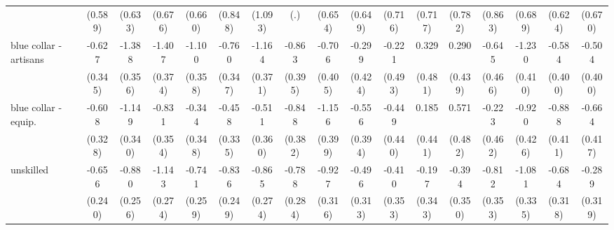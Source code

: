 {\begin{tabular}{l*{16}{c}}
                    &     (0.589)         &     (0.633)         &     (0.676)         &     (0.660)         &     (0.848)         &     (1.093)         &         (.)         &     (0.654)         &     (0.649)         &     (0.716)         &     (0.717)         &     (0.782)         &     (0.863)         &     (0.689)         &     (0.624)         &     (0.670)         \\
[1em]
blue collar - artisans&      -0.627         &      -1.388\sym{***}&      -1.407\sym{***}&      -1.100\sym{**} &      -0.760\sym{*}  &      -1.164\sym{**} &      -0.863\sym{*}  &      -0.706         &      -0.299         &      -0.221         &       0.329         &       0.290         &      -0.645         &      -1.230\sym{**} &      -0.584         &      -0.504         \\
                    &     (0.345)         &     (0.356)         &     (0.374)         &     (0.358)         &     (0.347)         &     (0.371)         &     (0.395)         &     (0.405)         &     (0.424)         &     (0.493)         &     (0.481)         &     (0.439)         &     (0.466)         &     (0.410)         &     (0.400)         &     (0.400)         \\
[1em]
blue collar - equip.&      -0.608         &      -1.149\sym{***}&      -0.831\sym{*}  &      -0.344         &      -0.458         &      -0.511         &      -0.848\sym{*}  &      -1.156\sym{**} &      -0.556         &      -0.449         &       0.185         &       0.571         &      -0.223         &      -0.920\sym{*}  &      -0.888\sym{*}  &      -0.664         \\
                    &     (0.328)         &     (0.340)         &     (0.354)         &     (0.348)         &     (0.335)         &     (0.360)         &     (0.382)         &     (0.399)         &     (0.394)         &     (0.440)         &     (0.441)         &     (0.482)         &     (0.462)         &     (0.426)         &     (0.411)         &     (0.417)         \\
[1em]
unskilled           &      -0.656\sym{**} &      -0.880\sym{***}&      -1.143\sym{***}&      -0.741\sym{**} &      -0.836\sym{***}&      -0.865\sym{**} &      -0.788\sym{**} &      -0.927\sym{**} &      -0.496         &      -0.410         &      -0.197         &      -0.394         &      -0.812\sym{*}  &      -1.081\sym{**} &      -0.684\sym{*}  &      -0.289         \\
                    &     (0.240)         &     (0.256)         &     (0.274)         &     (0.259)         &     (0.249)         &     (0.274)         &     (0.284)         &     (0.316)         &     (0.313)         &     (0.353)         &     (0.343)         &     (0.350)         &     (0.353)         &     (0.335)         &     (0.318)         &     (0.319)         \\

\end{tabular}}
